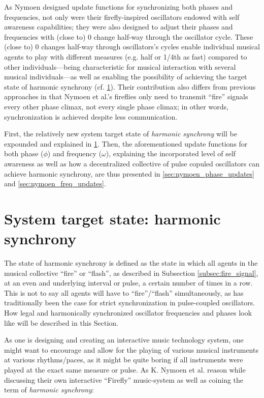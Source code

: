 As Nymoen designed update functions for synchronizing both phases and frequencies, not only were their firefly-inspired oscillators endowed with self awareness capabilities; they were also designed to adjust their phases and frequencies with (close to) 0 change half-way through the oscillator cycle. These (close to) 0 changes half-way through oscillators's cycles enable individual musical agents to play with different measures (e.g. half or 1/4th as fast) compared to other individuals—being characteristic for musical interaction with several musical individuals—as well as enabling the possibility of achieving the target state of harmonic synchrony (cf. \ref{sec:harmonic_synchrony}). Their contribution also differs from previous approaches in that Nymoen et al.'s fireflies only need to transmit ``fire'' signals every other phase climax, not every single phase climax; in other words, synchronization is achieved despite less communication.

First, the relatively new system target state of \textit{harmonic synchrony} will be expounded and explained in \ref{sec:harmonic_synchrony}. Then, the aforementioned update functions for both phase ($\phi$) and frequency ($\omega$), explaining the incorporated level of self awareness as well as how a decentralized collective of pulse copuled oscillators can achieve harmonic synchrony, are thus presented in \ref{sec:nymoen_phase_updates} and \ref{sec:nymoen_freq_updates}.



\section{System target state: harmonic synchrony}
\label{sec:harmonic_synchrony}

The state of harmonic synchrony is defined \cite{nymoen_synch} as the state in which all agents in the musical collective ``fire'' or ``flash'', as described in Subsection \ref{subsec:fire_signal}, at an even and underlying interval or pulse, a certain number of times in a row. This is not to say all agents will have to ``fire''/``flash'' simultaneously, as has traditionally been the case for strict synchronization in pulse-coupled oscillators. How legal and harmonically synchronized oscillator frequencies and phases look like will be described in this Section.

As one is designing and creating an interactive music technology system, one might want to encourage and allow for the playing of various musical instruments at various rhythms/paces, as it might be quite boring if all instruments were played at the exact same measure or pulse. As K. Nymoen et al. \cite{nymoen_synch} reason while discussing their own interactive ``Firefly'' music-system as well as coining the term of \textit{harmonic synchrony}: \nl

